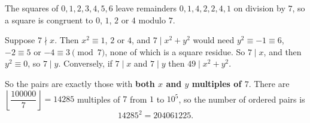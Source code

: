The squares of $0,1,2,3,4,5,6$ leave remainders $0,1,4,2,2,4,1$ on division by $7$, so a square is congruent to $0$, $1$, $2$ or $4$ modulo $7$.

Suppose $7\nmid x$. Then $x^2\equiv1$, $2$ or $4$, and $7\mid x^2+y^2$ would need $y^2\equiv-1\equiv6$, $-2\equiv5$ or $-4\equiv3\pmod7$, none of which is a square residue. So $7\mid x$, and then $y^2\equiv0$, so $7\mid y$. Conversely, if $7\mid x$ and $7\mid y$ then $49\mid x^2+y^2$.

So the pairs are exactly those with \textbf{both $x$ and $y$ multiples of $7$}. There are $\left\lfloor\dfrac{100000}{7}\right\rfloor=14285$ multiples of $7$ from $1$ to $10^5$, so the number of ordered pairs is
\[
14285^2=\boxed{204061225}.
\]
